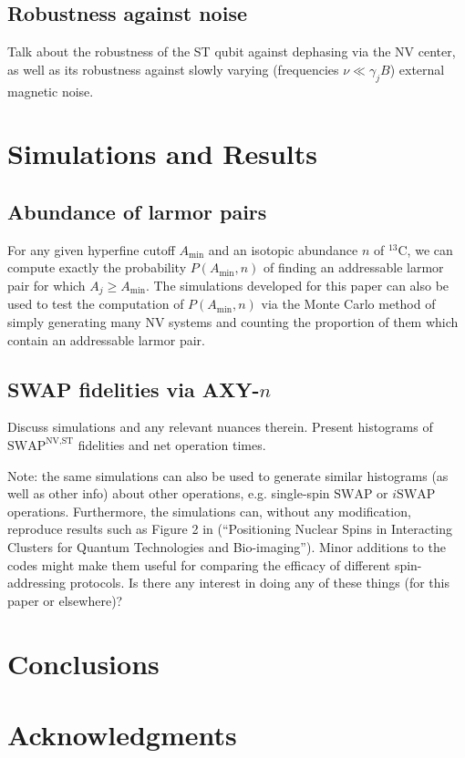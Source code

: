 \documentclass[twocolumn]{revtex4}
\renewcommand{\t}{\text} %
\newcommand{\p}[1]{\left(#1\right)} %
\newcommand{\SWAP}{\t{SWAP}}
\newcommand{\NV}{\t{NV}}
\newcommand{\ST}{\t{ST}}
\begin{document}

\subsection{Robustness against noise}

Talk about the robustness of the ST qubit against dephasing via the NV
center, as well as its robustness against slowly varying (frequencies
$\nu\ll\gamma_jB$) external magnetic noise.

\section{Simulations and Results}

\subsection{Abundance of larmor pairs}

For any given hyperfine cutoff $A_\t{min}$ and an isotopic abundance
$n$ of $^{13}$C, we can compute exactly the probability
$P\p{A_\t{min},n}$ of finding an addressable larmor pair for which
$A_j\ge A_\t{min}$. The simulations developed for this paper can also
be used to test the computation of $P\p{A_\t{min},n}$ via the Monte
Carlo method of simply generating many NV systems and counting the
proportion of them which contain an addressable larmor pair.

\subsection{SWAP fidelities via AXY-$n$}

Discuss simulations and any relevant nuances therein. Present
histograms of $\SWAP^{\NV,\ST}$ fidelities and net operation times.

Note: the same simulations can also be used to generate similar
histograms (as well as other info) about other operations,
e.g. single-spin $\SWAP$ or $i\SWAP$ operations. Furthermore, the
simulations can, without any modification, reproduce results such as
Figure 2 in \cite{wang2015positioning} (``Positioning Nuclear Spins in
Interacting Clusters for Quantum Technologies and
Bio-imaging''). Minor additions to the codes might make them useful
for comparing the efficacy of different spin-addressing protocols. Is
there any interest in doing any of these things (for this paper or
elsewhere)?

\section{Conclusions}

\section{Acknowledgments}

\footnotesize 
\end{document}
